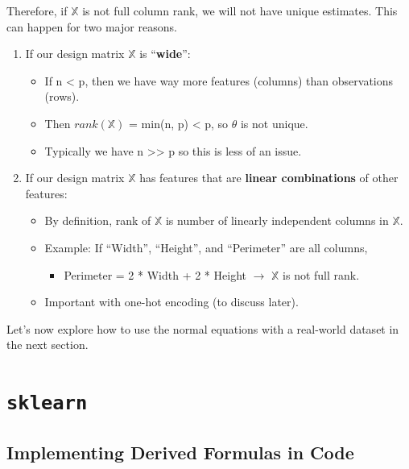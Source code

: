 \documentclass[
  letterpaper,
  DIV=11,
  numbers=noendperiod]{scrreprt}
\providecommand{\tightlist}{%
  \setlength{\itemsep}{0pt}\setlength{\parskip}{0pt}}\usepackage{longtable,booktabs,array}
\begin{document}
Therefore, if \(\mathbb{X}\) is not full column rank, we will not have
unique estimates. This can happen for two major reasons.

\begin{enumerate}
\def\labelenumi{\arabic{enumi}.}
\tightlist
\item
  If our design matrix \(\mathbb{X}\) is ``\textbf{wide}'':

  \begin{itemize}
  \tightlist
  \item
    If n \textless{} p, then we have way more features (columns) than
    observations (rows).
  \item
    Then \(rank(\mathbb{X})\) = min(n, p) \textless{} p, so
    \(\hat{\theta}\) is not unique.
  \item
    Typically we have n \textgreater\textgreater{} p so this is less of
    an issue.
  \end{itemize}
\item
  If our design matrix \(\mathbb{X}\) has features that are
  \textbf{linear combinations} of other features:

  \begin{itemize}
  \tightlist
  \item
    By definition, rank of \(\mathbb{X}\) is number of linearly
    independent columns in \(\mathbb{X}\).
  \item
    Example: If ``Width'', ``Height'', and ``Perimeter'' are all
    columns,

    \begin{itemize}
    \tightlist
    \item
      Perimeter = 2 * Width + 2 * Height \(\rightarrow\) \(\mathbb{X}\)
      is not full rank.
    \end{itemize}
  \item
    Important with one-hot encoding (to discuss later).
  \end{itemize}
\end{enumerate}

Let's now explore how to use the normal equations with a real-world
dataset in the next section.

\section{\texorpdfstring{\texttt{sklearn}}{sklearn}}\label{sklearn}

\subsection{Implementing Derived Formulas in
Code}\label{implementing-derived-formulas-in-code}
\end{document}
